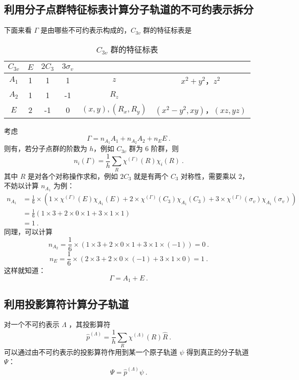 \subsection{利用分子点群特征标表计算分子轨道的不可约表示拆分}
下面来看 $\Gamma$ 是由哪些不可约表示构成的，$C_{3v}$ 群的特征标表是
\begin{table}[ht]
\centering
\caption{$C_{3v}$ 群的特征标表}\label{tab_SALCs2}
\begin{tabular}{|c|c|c|c|c|c|}
\hline
$C_{3v}$ & $E$ & $2C_3$ & $3\sigma_v$ &  &  \\
\hline
$A_1$ & 1 & 1 & 1 & $z$ & $x^2+y^2$，$z^2$ \\
\hline
$A_2$ & 1 & 1 & -1 & $R_z$ &  \\
\hline
$E$ & 2 & -1 & 0 & $(x, y), (R_x, R_y)$ & $(x^2-y^2, xy)$，$(xz,yz)$ \\
\hline
\end{tabular}
\end{table}
考虑
\begin{equation}
\Gamma = n_{A_1} A_1 + n_{A_2} A_2 + n_{E} E ~.
\end{equation}
则有，若分子点群的阶数为 $h$，例如 $C_{3v}$ 群为 $6$ 阶群，则 
\begin{equation}
n_i(\Gamma) = \frac{1}{h} \sum_R \chi^{(\Gamma)}(R) \chi_i(R) ~.
\end{equation}
其中 $R$ 是对各个对称操作求和，例如 $2C_3$ 就是有两个 $C_3$ 对称性，需要乘以 $2$，不妨以计算 $n_{A_1}$ 为例：
\begin{equation}
\begin{aligned}
n_{A_1} &= \frac{1}{6} \times (1 \times \chi^{(\Gamma)}(E)\chi_{A_1}(E) + 2 \times\chi^{(\Gamma)}(C_3)\chi_{A_1}(C_3)+3\times\chi^{(\Gamma)}(\sigma_v)\chi_{A_1}(\sigma_v)   ) \\
&=\frac{1}{6} (1 \times 3 + 2 \times 0 \times 1 + 3 \times 1 \times 1 )\\
& = 1 ~.
\end{aligned}
\end{equation}
同理，可以计算 
\begin{equation}
n_{A_2} = \frac{1}{6} \times (1 \times 3 + 2 \times 0 \times 1+ 3 \times 1 \times (-1)) = 0 ~.
\end{equation}
\begin{equation}
n_{E} = \frac{1}{6} \times (2 \times 3 + 2 \times 0 \times (-1) + 3 \times 1 \times 0) = 1 ~.
\end{equation}
这样就知道：
$$\Gamma = A_1 + E ~.$$
\subsection{利用投影算符计算分子轨道}
对一个不可约表示 $\Lambda$ ，其投影算符
$$\hat{p}^{(\Lambda)} = \frac{1}{h} \sum_{R} \chi^{(\Lambda)}(R) \hat R ~.$$
可以通过由不可约表示的投影算符作用到某一个原子轨道 $\psi$ 得到真正的分子轨道 $\Psi$：
$$\Psi = \hat{p}^{(\Lambda)} \psi ~.$$
